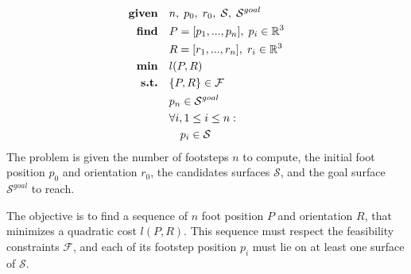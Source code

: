 \begin{equation}
\label{eq:mip_simple}
\begin{aligned}
    \textrm{\textbf{given}} %
                            \quad & n, \; p_0, \; r_0, \; \mathcal{S}, \; \mathcal{S}^{goal} \nonumber\\
    \textrm{\textbf{find}}  \quad & P=[p_1,...,p_n], \; p_i \in \mathbb{R}^{3}\\
                            \quad & R=[r_1,...,r_n], \; r_i \in \mathbb{R}^{3}\\
    \textrm{\textbf{min}}  \quad & l(P,R)\\
    \textrm{\textbf{s.t.}}  \quad & \{P,R\} \in \mathcal{F}\\
                            \quad & p_n \in \mathcal{S}^{goal}\\
                            \quad & \forall i, 1 \leq i \leq n :\\
                                \quad & \quad p_i \in \mathcal{S}\\
\end{aligned}
\end{equation}
The problem is given the number of footsteps $n$ to compute, the initial foot position $p_0$ and orientation $r_0$, the candidates surfaces $\mathcal{S}$, and the goal surface $\mathcal{S}^{goal}$ to reach.

The objective is to find a sequence of $n$ foot position $P$ and orientation $R$, that minimizes a quadratic cost $l(P,R)$.
This sequence must respect the feasibility constraints $\mathcal{F}$, and each of its footstep position $p_i$ must lie on at least one surface of $\mathcal{S}$.

